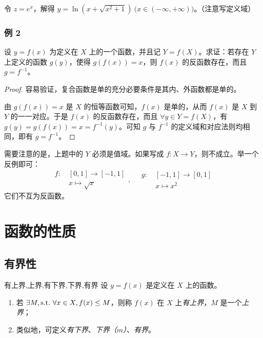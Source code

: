 \begin{solve}[反解 $x$]
	令 $z = e^x$，解得 $y = \ln \left( x + \sqrt{x^2 + 1} \right) \pod{x \in (-\infty, +\infty)}$。（注意写定义域）
\end{solve}

\subsubsection*{例 2}

设 $y = f(x)$ 为定义在 $X$ 上的一个函数，并且记 $Y = f(X)$。求证：若存在 $Y$ 上定义的函数 $g(y)$，使得 $g(f(x)) = x$，则 $f(x)$ 的反函数存在，而且 $g = f^{-1}$。

\begin{proof}
	容易验证，复合函数是单的充分必要条件是其内、外函数都是单的。

	由 $g(f(x)) = x$ 是 $X$ 的恒等函数可知，$f(x)$ 是单的，从而 $f(x)$ 是 $X$ 到 $Y$ 的一一对应。于是 $f(x)$ 的反函数存在，而且 $\forall y \in Y = f(X)$，有 $g(y) = g(f(x)) = x = f^{-1}(y)$。可知 $g$ 与 $f^{-1}$ 的定义域和对应法则均相同，即有 $g = f^{-1}$。
\end{proof}

需要注意的是，上题中的 $Y$ 必须是值域。如果写成 $f: X \rightarrow Y$，则不成立。举一个反例即可：
$$
\begin{aligned}
	f:~&[0, 1] \rightarrow [-1, 1]
	\\&
	x \mapsto \sqrt x
\end{aligned}
, \quad
\begin{aligned}
	g:~&[-1, 1] \rightarrow [0, 1]
	\\&
	x \mapsto x^2
\end{aligned}
$$
它们不互为反函数。

\section{函数的性质}

\subsection{有界性}

\begin{definition}{有上界,上界,有下界,下界,有界}
	设 $y = f(x)$ 是定义在 $X$ 上的函数。

	\begin{enumerate}
		\item 若 $\exists M, \text{s.t.~} \forall x \in X, f(x) \le M$，则称 $f(x)$ 在 $X$ 上\emph{有上界}，$M$ 是一个\emph{上界}；
		\item 类似地，可定义\emph{有下界}、\emph{下界（$m$）}、\emph{有界}。
	\end{enumerate}
\end{definition}

